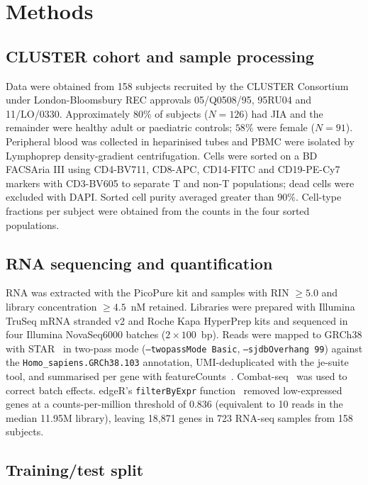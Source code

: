 \documentclass[11pt]{article}
\begin{document}
\section{Methods}

\subsection{CLUSTER cohort and sample processing}

Data were obtained from 158 subjects recruited by the CLUSTER
Consortium under London-Bloomsbury REC approvals 05/Q0508/95, 95RU04
and 11/LO/0330. Approximately $80\%$ of subjects ($N = 126$) had JIA
and the remainder were healthy adult or paediatric controls; $58\%$
were female ($N = 91$). Peripheral blood was collected in heparinised
tubes and PBMC were isolated by Lymphoprep density-gradient
centrifugation. Cells were sorted on a BD FACSAria III using
CD4-BV711, CD8-APC, CD14-FITC and CD19-PE-Cy7 markers with CD3-BV605
to separate T and non-T populations; dead cells were excluded with
DAPI. Sorted cell purity averaged greater than $90\%$. Cell-type
fractions per subject were obtained from the counts in the four sorted
populations.

\subsection{RNA sequencing and quantification}

RNA was extracted with the PicoPure kit and samples with RIN $\geq 5.0$
and library concentration $\geq 4.5$~nM retained. Libraries were
prepared with Illumina TruSeq mRNA stranded v2 and Roche Kapa HyperPrep
kits and sequenced in four Illumina NovaSeq6000 batches
($2 \times 100$~bp). Reads were mapped to GRCh38 with
STAR~\citep{dobin2013star} in two-pass mode (\texttt{--twopassMode
Basic}, \texttt{--sjdbOverhang 99}) against the
\texttt{Homo\_sapiens.GRCh38.103} annotation, UMI-deduplicated with the
je-suite tool, and summarised per gene with
featureCounts~\citep{liao2014featurecounts}. Combat-seq~\citep{zhang2020combatseq}
was used to correct batch effects. edgeR's \texttt{filterByExpr}
function~\citep{robinson2010edger} removed low-expressed genes at a
counts-per-million threshold of 0.836 (equivalent to 10 reads in the
median 11.95M library), leaving 18{,}871 genes in 723 RNA-seq samples
from 158 subjects.

\subsection{Training/test split}
\end{document}
